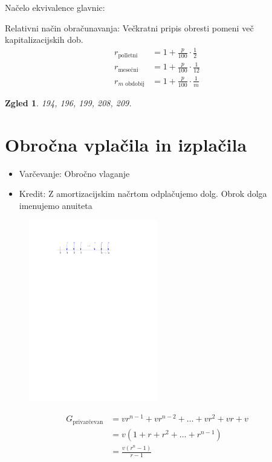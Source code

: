 \documentclass{article}
\newtheorem*{zgled}{Zgled}
\begin{document}
Načelo ekvivalence glavnic:

Relativni način obračunavanja: Večkratni pripis obresti pomeni več kapitalizacijskih dob.
\begin{align*} 
    r_\text{polletni}&=1+\frac{p}{100}\cdot\frac{1}{2}\\
    r_\text{mesečni}&=1+\frac{p}{100}\cdot\frac{1}{12}\\
    r_\text{$m$ obdobij}&=1+\frac{p}{100}\cdot\frac{1}{m}
\end{align*}

\begin{zgled}
    194, 196, 199, 208, 209.
\end{zgled}

\section{Obročna vplačila in izplačila}

\begin{itemize}
    \item Varčevanje: Obročno vlaganje
    \item Kredit: Z amortizacijskim načrtom odplačujemo dolg. Obrok dolga imenujemo anuiteta
\end{itemize}

\begin{figure}[H]
\includegraphics[width=0.5\textwidth]{vplacila.pdf}
\centering
\end{figure}
\begin{align*}
    G_{\text{privarčevan}} &= vr^{n-1}+vr^{n-2}+\ldots+vr^2+vr+v\\
        &=v(1+r+r^2+\ldots+r^{n-1})\\
        &=\frac{v(r^n-1)}{r-1}
\end{align*}
\end{document}

